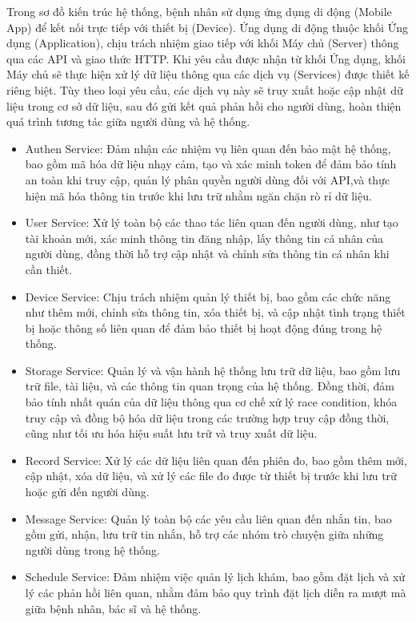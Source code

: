 Trong sơ đồ kiến trúc hệ thống, bệnh nhân sử dụng ứng dụng di động (Mobile App) để kết nối trực tiếp với thiết bị (Device).
Ứng dụng di động thuộc khối Ứng dụng (Application), chịu trách nhiệm giao tiếp với khối Máy chủ (Server) thông qua các API và giao thức HTTP.
Khi yêu cầu được nhận từ khối Ứng dụng, khối Máy chủ sẽ thực hiện xử lý dữ liệu thông qua các dịch vụ (Services) được thiết kế riêng biệt.
Tùy theo loại yêu cầu, các dịch vụ này sẽ truy xuất hoặc cập nhật dữ liệu trong cơ sở dữ liệu, sau đó gửi kết quả phản hồi cho người dùng,
hoàn thiện quá trình tương tác giữa người dùng và hệ thống.\begin{adjustwidth}{1.5em}{}
	\begin{itemize}
		\item Authen Service: Đảm nhận các nhiệm vụ liên quan đến bảo mật hệ thống, bao gồm mã hóa dữ liệu nhạy cảm, tạo và xác minh token để đảm bảo tính an toàn khi truy cập,
		      quản lý phân quyền người dùng đối với API,và thực hiện mã hóa thông tin trước khi lưu trữ nhằm ngăn chặn rò rỉ dữ liệu.
		\item User Service: Xử lý toàn bộ các thao tác liên quan đến người dùng, như tạo tài khoản mới, xác minh thông tin đăng nhập, lấy thông tin cá nhân của người dùng,
		      đồng thời hỗ trợ cập nhật và chỉnh sửa thông tin cá nhân khi cần thiết.
		\item Device Service: Chịu trách nhiệm quản lý thiết bị, bao gồm các chức năng như thêm mới, chỉnh sửa thông tin, xóa thiết bị,
		      và cập nhật tình trạng thiết bị hoặc thông số liên quan để đảm bảo thiết bị hoạt động đúng trong hệ thống.
		\item Storage Service: Quản lý và vận hành hệ thống lưu trữ dữ liệu, bao gồm lưu trữ file, tài liệu, và các thông tin quan trọng của hệ thống.
		      Đồng thời, đảm bảo tính nhất quán của dữ liệu thông qua cơ chế xử lý race condition, khóa truy cập và đồng bộ hóa dữ liệu trong các trường hợp truy cập đồng thời,
		      cũng như tối ưu hóa hiệu suất lưu trữ và truy xuất dữ liệu.
		\item Record Service: Xử lý các dữ liệu liên quan đến phiên đo, bao gồm thêm mới, cập nhật, xóa dữ liệu, và xử lý các file đo được từ thiết bị trước khi lưu trữ hoặc gửi đến người dùng.
		\item Message Service: Quản lý toàn bộ các yêu cầu liên quan đến nhắn tin, bao gồm gửi, nhận, lưu trữ tin nhắn, hỗ trợ các nhóm trò chuyện giữa những người dùng trong hệ thống.
		\item Schedule Service: Đảm nhiệm việc quản lý lịch khám, bao gồm đặt lịch và xử lý các phản hồi liên quan, nhằm đảm bảo quy trình đặt lịch diễn ra mượt mà giữa bệnh nhân, bác sĩ và hệ thống.

\end{itemize}
\end{adjustwidth}
